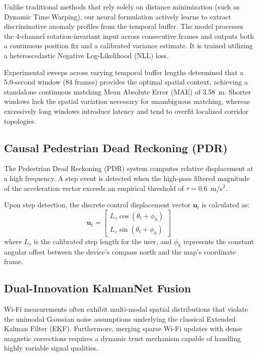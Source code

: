 \documentclass[conference]{IEEEtran}
\begin{document}
Unlike traditional methods that rely solely on distance minimization (such as Dynamic Time Warping), our neural formulation actively learns to extract discriminative anomaly profiles from the temporal buffer. The model processes the 4-channel rotation-invariant input across consecutive frames and outputs both a continuous position fix and a calibrated variance estimate. It is trained utilizing a heteroscedastic Negative Log-Likelihood (NLL) loss. 

Experimental sweeps across varying temporal buffer lengths determined that a 5.0-second window (84 frames) provides the optimal spatial context, achieving a standalone continuous matching Mean Absolute Error (MAE) of 3.58~m. Shorter windows lack the spatial variation necessary for unambiguous matching, whereas excessively long windows introduce latency and tend to overfit localized corridor topologies.

\subsection{Causal Pedestrian Dead Reckoning (PDR)}

The Pedestrian Dead Reckoning (PDR) system computes relative displacement at a high frequency. A step event is detected when the high-pass filtered magnitude of the acceleration vector exceeds an empirical threshold of $\tau = 0.6$~m/s$^2$. 

Upon step detection, the discrete control displacement vector $\mathbf{u}_t$ is calculated as:
\begin{equation}
\mathbf{u}_t = \begin{bmatrix} L_s \cos(\theta_t + \phi_h) \\ L_s \sin(\theta_t + \phi_h) \end{bmatrix}
\end{equation}
where $L_s$ is the calibrated step length for the user, and $\phi_h$ represents the constant angular offset between the device's compass north and the map's coordinate frame. 

\subsection{Dual-Innovation KalmanNet Fusion}\label{sec:kalmannet}

Wi-Fi measurements often exhibit multi-modal spatial distributions that violate the unimodal Gaussian noise assumptions underlying the classical Extended Kalman Filter (EKF). Furthermore, merging sparse Wi-Fi updates with dense magnetic corrections requires a dynamic trust mechanism capable of handling highly variable signal qualities. 
\end{document}
